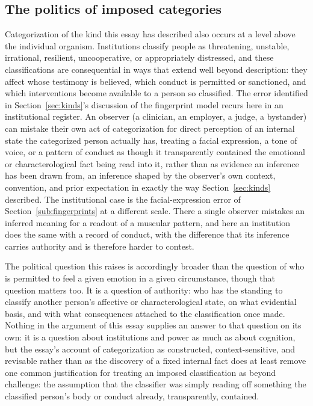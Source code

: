 \documentclass[11pt]{article}
\begin{document}
\subsection{The politics of imposed categories}\label{sub:politics}

Categorization of the kind this essay has described also occurs at a level above the individual organism. Institutions classify people as threatening, unstable, irrational, resilient, uncooperative, or appropriately distressed, and these classifications are consequential in ways that extend well beyond description: they affect whose testimony is believed, which conduct is permitted or sanctioned, and which interventions become available to a person so classified. The error identified in Section~\ref{sec:kinds}'s discussion of the fingerprint model recurs here in an institutional register. An observer (a clinician, an employer, a judge, a bystander) can mistake their own act of categorization for direct perception of an internal state the categorized person actually has, treating a facial expression, a tone of voice, or a pattern of conduct as though it transparently contained the emotional or characterological fact being read into it, rather than as evidence an inference has been drawn from, an inference shaped by the observer's own context, convention, and prior expectation in exactly the way Section~\ref{sec:kinds} described. The institutional case is the facial-expression error of Section~\ref{sub:fingerprints} at a different scale. There a single observer mistakes an inferred meaning for a readout of a muscular pattern, and here an institution does the same with a record of conduct, with the difference that its inference carries authority and is therefore harder to contest.

The political question this raises is accordingly broader than the question of who is permitted to feel a given emotion in a given circumstance, though that question matters too. It is a question of authority: who has the standing to classify another person's affective or characterological state, on what evidential basis, and with what consequences attached to the classification once made. Nothing in the argument of this essay supplies an answer to that question on its own: it is a question about institutions and power as much as about cognition, but the essay's account of categorization as constructed, context-sensitive, and revisable rather than as the discovery of a fixed internal fact does at least remove one common justification for treating an imposed classification as beyond challenge: the assumption that the classifier was simply reading off something the classified person's body or conduct already, transparently, contained.
\end{document}
